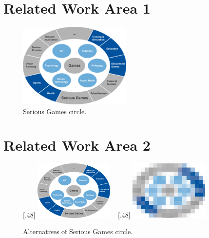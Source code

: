 \section{Related Work Area 1}

\begin{figure}[htb]
	\centering
 	\includegraphics[width=0.5\textwidth]{gfx/sg-circle.png}  	  	 	
	\caption{Serious Games circle.}
	\label{fig:example1}
\end{figure}

\section{Related Work Area 2}

\begin{figure}[htb]
	\centering	
 		[.48\linewidth]{
  		\includegraphics[width=0.35\textwidth]{gfx/sg-smiley.png} 	
  	}  	
  	~
 		[.48\linewidth]{
  		\includegraphics[width=0.35\textwidth]{gfx/sg-circle_improved.png}  	
  	}	  
  		
	\caption{Alternatives of Serious Games circle.}
	\label{fig:ex_2_3}
\end{figure}

